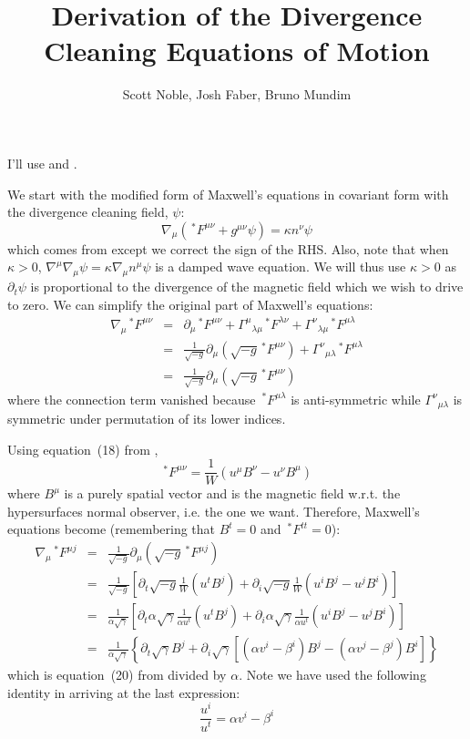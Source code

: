 \documentclass[11pt,preprint]{aastex}
\title{Derivation of the Divergence Cleaning Equations of Motion}
\author{Scott Noble, Josh Faber, Bruno Mundim}
\date{}
\newcommand{\beq}[1]{\begin{equation} #1 \end{equation}}
\newcommand{\beqa}[1]{\begin{eqnarray} #1 \end{eqnarray}}
\newcommand{\maxwell}[2]{{\,}^*\!F^{#1 #2}}
\begin{document}
I'll use \cite{anton}  and \cite{penner}.

We start with the modified form of Maxwell's equations in covariant form with the divergence cleaning field, $\psi$:
\beq{
\nabla_\mu \left( \maxwell{\mu}{\nu} + g^{\mu \nu} \psi \right) =  \kappa n^\nu \psi
\label{general-div-cleaning-eq}
}
which comes from \cite{penner} except we correct the sign of the RHS.  Also, note that when $\kappa > 0$, $\nabla^\mu \nabla_\mu \psi = \kappa \nabla_\mu n^\mu \psi$ is 
a damped wave equation.   We will thus use $\kappa > 0$ as $\partial_t \psi$ is proportional to the divergence of the magnetic field which we wish to 
drive to zero. 
We can simplify the original part of Maxwell's equations:
\beqa{
\nabla_\mu   \maxwell{\mu}{\nu}  & = &\partial_\mu \maxwell{\mu}{\nu}+{\Gamma^\mu}_{\lambda\mu} 
\maxwell{\lambda}{\nu}+{\Gamma^\nu}_{\lambda\mu}\maxwell{\mu}{\lambda}\\
& = &\frac{1}{\sqrt{-g}} \partial_\mu \left( \sqrt{-g}  \maxwell{\mu}{\nu} \right)  
+ {\Gamma^\nu}_{\mu \lambda} \maxwell{\mu}{\lambda}   \\
& = & \frac{1}{\sqrt{-g}} \partial_\mu \left( \sqrt{-g}  \maxwell{\mu}{\nu} \right)  
}
where the connection term vanished because $\maxwell{\mu}{\lambda}$ is anti-symmetric while ${\Gamma^\nu}_{\mu \lambda}$
is symmetric under permutation of its lower indices. 

Using equation~(18) from \cite{anton}, 
\beq{
\maxwell{\mu}{\nu} = \frac{1}{W} \left( u^\mu B^\nu - u^\nu B^\mu \right)  \label{maxwell-tensor}
}
where $B^\mu$ is a purely spatial vector and is the magnetic field w.r.t. the hypersurfaces normal observer, i.e. the one we want. 
Therefore, Maxwell's equations become (remembering that $B^t=0$ and $\maxwell{t}{t} = 0$):
\beqa{
\nabla_\mu  \maxwell{\mu}{j} & = & \frac{1}{\sqrt{-g}} \partial_\mu \left( \sqrt{-g}  \maxwell{\mu}{j}  \right)  \\
& = & \frac{1}{\sqrt{-g}} \left[ \partial_t \sqrt{-g} \frac{1}{W} \left( u^t B^j \right) + 
\partial_i \sqrt{-g} \frac{1}{W} \left( u^i B^j - u^j B^i \right) \right] \\
& = & \frac{1}{\alpha \sqrt{\gamma}} \left[ \partial_t \alpha \sqrt{\gamma} \frac{1}{\alpha u^t} \left( u^t B^j \right) + 
\partial_i \alpha \sqrt{\gamma} \frac{1}{\alpha u^t} \left( u^i B^j - u^j B^i \right) \right] \\
& = & \frac{1}{\alpha \sqrt{\gamma}} \left\{ \partial_t \sqrt{\gamma}  B^j + 
\partial_i  \sqrt{\gamma} \left[ \left(\alpha v^i - \beta^i\right) B^j - \left(\alpha v^j - \beta^j\right) B^i \right] \right\}
}
which is equation~(20) from \cite{anton} divided by $\alpha$. 
Note we have used the following identity in arriving at the last expression:
\beq{
\frac{u^i}{u^t} = \alpha v^i - \beta^i 
}
\end{document}
